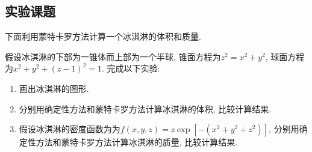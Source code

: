 \documentclass[a4paper,12pt]{article}
\begin{document}
\begin{CJK*}{UTF8}{gbsn}



\section{实验课题}
下面利用蒙特卡罗方法计算一个冰淇淋的体积和质量.\par
假设冰淇淋的下部为一锥体而上部为一个半球, 锥面方程为$z^2=x^2+y^2$, 球面方程为$x^2+y^2+(z-1)^2=1$. 完成以下实验:\par 
\begin{enumerate}
\item 画出冰淇淋的图形.
\item 分别用确定性方法和蒙特卡罗方法计算冰淇淋的体积, 比较计算结果.
\item 假设冰淇淋的密度函数为为$f(x,y,z)=z\exp{[-(x^2+y^2+z^2)]}$, 分别用确定性方法和蒙特卡罗方法计算冰淇淋的质量, 比较计算结果.
\end{enumerate}




\end{CJK*}
\end{document}
